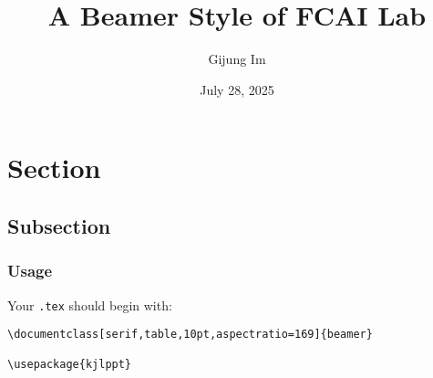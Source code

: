 \documentclass[serif,table,10pt,aspectratio=169]{beamer} %
\title{\large
A Beamer Style of FCAI Lab
}
\date[August, 2025]{July 28, 2025}
\author{Gijung Im}
\institute{FCAI Lab \\Yonsei University}
\begin{document}
\frame{\titlepage}

\section{Section}

\subsection{Subsection}

\begin{frame}[fragile]
\frametitle{Usage}

Your \texttt{.tex} should begin with:
\begin{lstlisting}
\documentclass[serif,table,10pt,aspectratio=169]{beamer}

\usepackage{kjlppt}
\end{lstlisting}

\end{frame}
\end{document}
